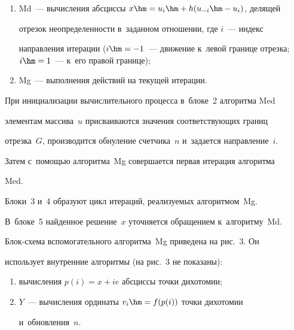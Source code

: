   \begin{enumerate}[(1)]


\item Md~--- вычисления абсциссы $x \hm= u_i \hm+ h (u_{-i}\hm- u_i)$, делящей 


отрезок неопределенности в~заданном отношении, где $i$~--- индекс 


направления итерации ($i \hm= -1$~--- движение к~левой границе отрезка; $i 


\hm= 1$~--- к~его правой границе);


\item Mg~--- выполнения действий на текущей итерации. 


\end{enumerate}








  При инициализации вычислительного процесса в~блоке~2 алгоритма Med 


элементам массива~$u$ присваиваются значения соответствующих границ 


отрезка~$G$, производится обнуление счетчика~$n$  и~задается направление~$i$. 


Затем с~по\-мощью алгоритма~Mg совершается первая итерация алгоритма 


Med.


  


  Блоки~3 и~4 образуют цикл итераций, реализуемых алгоритмом~Mg. 


В~блоке~5 найденное решение~$x$ уточняется обращением к~алгоритму~Md.  


  


  Блок-схема вспомогательного алгоритма~Mg приведена на рис.~3. Он 


использует внутренние алгоритмы (на рис.~3 не показаны):


  \begin{enumerate}[(1)]


\item вычисления $p(i) = x + ie$ абсциссы точки дихотомии;


\item $Y$~--- вычисления ординаты $v_i \hm= f(p(i))$ точки дихотомии 


и~обновления~$n$.


\end{enumerate}





